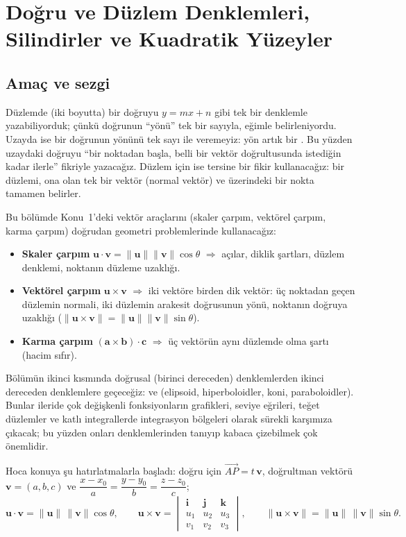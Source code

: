 \section{Doğru ve Düzlem Denklemleri, Silindirler ve Kuadratik Yüzeyler}

\subsection{Amaç ve sezgi}

Düzlemde (iki boyutta) bir doğruyu $y=mx+n$ gibi tek bir denklemle yazabiliyorduk; çünkü doğrunun ``yönü'' tek bir sayıyla, eğimle belirleniyordu. Uzayda ise bir doğrunun yönünü tek sayı ile veremeyiz: yön artık bir . Bu yüzden uzaydaki doğruyu ``bir noktadan başla, belli bir vektör doğrultusunda istediğin kadar ilerle'' fikriyle yazacağız. Düzlem için ise tersine bir fikir kullanacağız: bir düzlemi, ona  olan tek bir vektör (normal vektör) ve üzerindeki bir nokta tamamen belirler.

Bu bölümde Konu~1'deki vektör araçlarını (skaler çarpım, vektörel çarpım, karma çarpım) doğrudan geometri problemlerinde kullanacağız:
\begin{itemize}
  \item \textbf{Skaler çarpım} $\mathbf u\cdot\mathbf v=\|\mathbf u\|\|\mathbf v\|\cos\theta$ $\Rightarrow$ açılar, diklik şartları, düzlem denklemi, noktanın düzleme uzaklığı.
  \item \textbf{Vektörel çarpım} $\mathbf u\times\mathbf v$ $\Rightarrow$ iki vektöre birden dik vektör: üç noktadan geçen düzlemin normali, iki düzlemin arakesit doğrusunun yönü, noktanın doğruya uzaklığı ($\|\mathbf u\times\mathbf v\|=\|\mathbf u\|\|\mathbf v\|\sin\theta$).
  \item \textbf{Karma çarpım} $(\mathbf a\times\mathbf b)\cdot\mathbf c$ $\Rightarrow$ üç vektörün aynı düzlemde olma şartı (hacim sıfır).
\end{itemize}
Bölümün ikinci kısmında doğrusal (birinci dereceden) denklemlerden ikinci dereceden denklemlere geçeceğiz:  ve  (elipsoid, hiperboloidler, koni, paraboloidler). Bunlar ileride çok değişkenli fonksiyonların grafikleri, seviye eğrileri, teğet düzlemler ve katlı integrallerde integrasyon bölgeleri olarak sürekli karşımıza çıkacak; bu yüzden onları denklemlerinden tanıyıp kabaca çizebilmek çok önemlidir.

\begin{tahta}
Hoca konuya şu hatırlatmalarla başladı: doğru için $\overrightarrow{AP}=t\,\mathbf v$, doğrultman vektörü $\mathbf v=(a,b,c)$ ve
$\dfrac{x-x_0}{a}=\dfrac{y-y_0}{b}=\dfrac{z-z_0}{c}$;
\[
\mathbf u\cdot\mathbf v=\|\mathbf u\|\,\|\mathbf v\|\cos\theta,\qquad
\mathbf u\times\mathbf v=\begin{vmatrix}\mathbf i&\mathbf j&\mathbf k\\u_1&u_2&u_3\\v_1&v_2&v_3\end{vmatrix},\qquad
\|\mathbf u\times\mathbf v\|=\|\mathbf u\|\,\|\mathbf v\|\sin\theta .
\]
\end{tahta}

